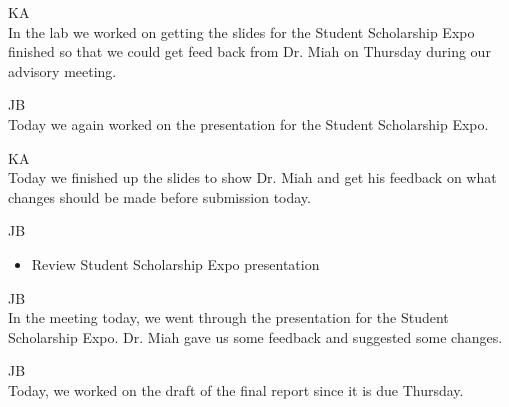 \documentclass[fontsize=11pt, %
                             paper=letter, %
                             openany, %
                             captions=tableheading,
                             index=totoc,
                             hyperref]{labbook}
\begin{document}
\begin{addmargin}[0cm]{0cm}
\vspace*{12pt}
KA\\
In the lab we worked on getting the slides for the Student Scholarship Expo finished so that we could get feed back from Dr. Miah on Thursday during our advisory meeting.

JB\\
Today we again worked on the presentation for the Student Scholarship Expo.

\vspace*{12pt}
KA\\
Today we finished up the slides to show Dr. Miah and get his feedback on what changes should be made before submission today.

JB\\
\begin{itemize}
    \item Review Student Scholarship Expo presentation
\end{itemize}

JB\\
In the meeting today, we went through the presentation for the Student Scholarship Expo. Dr. Miah gave us some feedback and suggested some changes.

JB\\
Today, we worked on the draft of the final report since it is due Thursday.

\end{addmargin}











\end{document}
